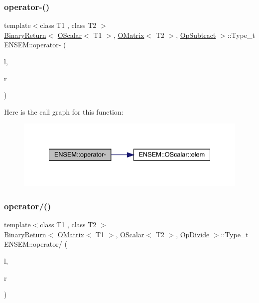 \subsubsection{\texorpdfstring{operator-\/()}{operator-()}\hspace{0.1cm}{\footnotesize\ttfamily [4/4]}}
{\footnotesize\ttfamily template$<$class T1 , class T2 $>$ \\
\mbox{\hyperlink{structENSEM_1_1BinaryReturn}{Binary\+Return}}$<$ \mbox{\hyperlink{classENSEM_1_1OScalar}{O\+Scalar}}$<$ T1 $>$, \mbox{\hyperlink{classENSEM_1_1OMatrix}{O\+Matrix}}$<$ T2 $>$, \mbox{\hyperlink{structENSEM_1_1OpSubtract}{Op\+Subtract}} $>$\+::Type\+\_\+t E\+N\+S\+E\+M\+::operator-\/ (\begin{DoxyParamCaption}\item[{const \mbox{\hyperlink{classENSEM_1_1OScalar}{O\+Scalar}}$<$ T1 $>$ \&}]{l,  }\item[{const \mbox{\hyperlink{classENSEM_1_1OMatrix}{O\+Matrix}}$<$ T2 $>$ \&}]{r }\end{DoxyParamCaption})\hspace{0.3cm}{\ttfamily [inline]}}

Here is the call graph for this function\+:\nopagebreak
\begin{figure}[H]
\begin{center}
\leavevmode
\includegraphics[width=334pt]{d8/d55/group__obsmatrix_ga57164fdcdeca01384e08724c0cf01504_cgraph}
\end{center}
\end{figure}
\mbox{\label{group__obsmatrix_gaa90c91fdbe2814bb15f1ac76012585d8}} 
\subsubsection{\texorpdfstring{operator/()}{operator/()}}
{\footnotesize\ttfamily template$<$class T1 , class T2 $>$ \\
\mbox{\hyperlink{structENSEM_1_1BinaryReturn}{Binary\+Return}}$<$ \mbox{\hyperlink{classENSEM_1_1OMatrix}{O\+Matrix}}$<$ T1 $>$, \mbox{\hyperlink{classENSEM_1_1OScalar}{O\+Scalar}}$<$ T2 $>$, \mbox{\hyperlink{structENSEM_1_1OpDivide}{Op\+Divide}} $>$\+::Type\+\_\+t E\+N\+S\+E\+M\+::operator/ (\begin{DoxyParamCaption}\item[{const \mbox{\hyperlink{classENSEM_1_1OMatrix}{O\+Matrix}}$<$ T1 $>$ \&}]{l,  }\item[{const \mbox{\hyperlink{classENSEM_1_1OScalar}{O\+Scalar}}$<$ T2 $>$ \&}]{r }\end{DoxyParamCaption})\hspace{0.3cm}{\ttfamily [inline]}}

